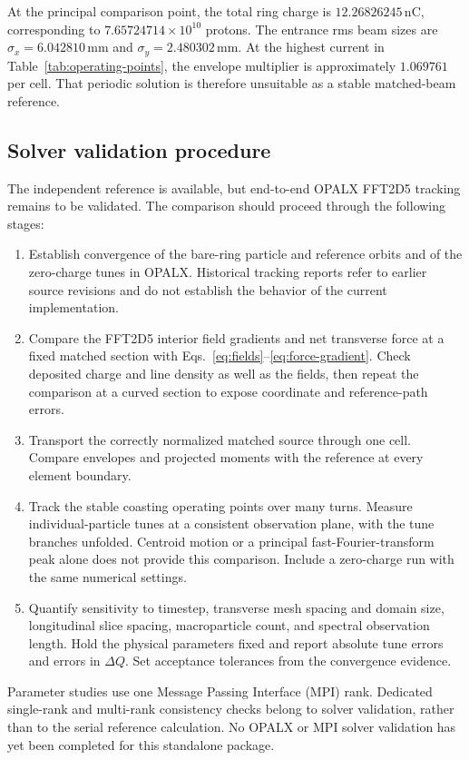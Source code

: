 \documentclass[11pt,a4paper]{article}
\numberwithin{equation}{section}
\newcommand{\units}[1]{\,\mathrm{#1}}
\begin{document}
At the principal comparison point, the total ring charge is
$12.26826245\units{nC}$, corresponding to
$7.65724714\times10^{10}$ protons. The entrance rms beam sizes are
$\sigma_x=6.042810\units{mm}$ and $\sigma_y=2.480302\units{mm}$.
At the highest current in Table~\ref{tab:operating-points}, the envelope
multiplier is approximately $1.069761$ per cell. That periodic solution
is therefore unsuitable as a stable matched-beam reference.

\subsection{Solver validation procedure}

The independent reference is available, but end-to-end OPALX FFT2D5
tracking remains to be validated. The comparison should proceed through
the following stages:
\begin{enumerate}[label=(\roman*)]
  \item Establish convergence of the bare-ring particle and reference
  orbits and of the zero-charge tunes in OPALX. Historical tracking
  reports refer to earlier source revisions and do not establish the
  behavior of the current implementation.
  \item Compare the FFT2D5 interior field gradients and net transverse
  force at a fixed matched section with Eqs.~\eqref{eq:fields}--\eqref{eq:force-gradient}.
  Check deposited charge and line density as well as the fields, then
  repeat the comparison at a curved section to expose coordinate and
  reference-path errors.
  \item Transport the correctly normalized matched source through one
  cell. Compare envelopes and projected moments with the reference at
  every element boundary.
  \item Track the stable coasting operating points over many turns.
  Measure individual-particle tunes at a consistent observation plane,
  with the tune branches unfolded. Centroid motion or a principal
  fast-Fourier-transform peak alone does not provide this comparison.
  Include a zero-charge run with the same numerical settings.
  \item Quantify sensitivity to timestep, transverse mesh spacing and
  domain size, longitudinal slice spacing, macroparticle count, and
  spectral observation length. Hold the physical parameters fixed and
  report absolute tune errors and errors in $\Delta Q$. Set acceptance tolerances
  from the convergence evidence.
\end{enumerate}
Parameter studies use one Message Passing Interface (MPI) rank. Dedicated
single-rank and multi-rank consistency checks belong to solver validation,
rather than to the serial reference calculation. No OPALX or MPI solver
validation has yet been completed for this standalone package.
\end{document}
